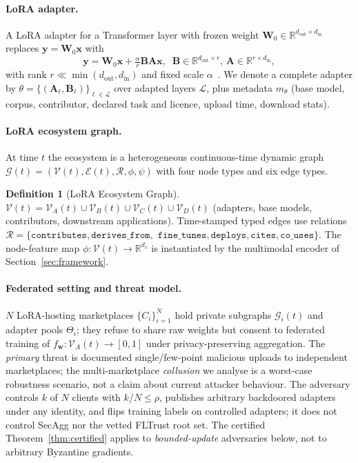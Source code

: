 \documentclass[11pt]{article}
\theoremstyle{plain}
\theoremstyle{definition}
\newtheorem{definition}{Definition}
\theoremstyle{remark}
\newcommand{\R}{\mathbb{R}}
\newcommand{\Gcal}{\mathcal{G}}
\newcommand{\Vcal}{\mathcal{V}}
\newcommand{\Ecal}{\mathcal{E}}
\newcommand{\Rcal}{\mathcal{R}}
\begin{document}
\paragraph{LoRA adapter.}
A LoRA adapter for a Transformer layer with frozen weight
$\mathbf{W}_0 \in \R^{d_{\mathrm{out}} \times d_{\mathrm{in}}}$
replaces $\mathbf{y} = \mathbf{W}_0 \mathbf{x}$ with
\begin{equation}
\mathbf{y} = \mathbf{W}_0 \mathbf{x} + \tfrac{\alpha}{r} \mathbf{B}\mathbf{A}\mathbf{x},\;\; \mathbf{B}\in\R^{d_{\mathrm{out}}\times r},\,\mathbf{A}\in\R^{r\times d_{\mathrm{in}}},
\label{eq:lora}
\end{equation}
with rank $r \ll \min(d_{\mathrm{out}}, d_{\mathrm{in}})$ and
fixed scale $\alpha$~\cite{hu2021lora}. We denote a complete
adapter by $\theta = \{(\mathbf{A}_\ell, \mathbf{B}_\ell)
\}_{\ell \in \mathcal{L}}$ over adapted layers $\mathcal{L}$,
plus metadata $m_\theta$ (base model, corpus, contributor,
declared task and licence, upload time, download stats).

\paragraph{LoRA ecosystem graph.}
At time $t$ the ecosystem is a heterogeneous continuous-time
dynamic graph $\Gcal(t) = (\Vcal(t), \Ecal(t), \Rcal, \phi, \psi)$
with four node types and six edge types.

\begin{definition}[LoRA Ecosystem Graph]
\label{def:graph}
$\Vcal(t) = \Vcal_A(t) \cup \Vcal_B(t) \cup \Vcal_C(t) \cup
\Vcal_D(t)$ (adapters, base models, contributors, downstream
applications). Time-stamped typed edges use relations $\Rcal =
\{\texttt{contributes}, \texttt{derives\_from},$
$\texttt{fine\_tunes}, \texttt{deploys}, \texttt{cites},
\texttt{co\_uses}\}$. The node-feature map $\phi:\Vcal(t)\to\R^{d_v}$
is instantiated by the multimodal encoder of
Section~\ref{sec:framework}.
\end{definition}

\paragraph{Federated setting and threat model.}
$N$ LoRA-hosting marketplaces $\{C_i\}_{i=1}^N$ hold private
subgraphs $\Gcal_i(t)$ and adapter pools $\Theta_i$; they refuse
to share raw weights but consent to federated training of
$f_{\mathbf{w}}:\Vcal_A(t)\!\to\![0,1]$ under privacy-preserving
aggregation. The \emph{primary} threat is documented
single/few-point malicious uploads to independent marketplaces;
the multi-marketplace \emph{collusion} we analyse is a worst-case
robustness scenario, not a claim about current attacker behaviour.
The adversary controls $k$ of $N$ clients with $k/N\!\le\!\rho$,
publishes arbitrary backdoored adapters under any identity, and
flips training labels on controlled adapters; it does not control
SecAgg nor the vetted FLTrust root set. The certified
Theorem~\ref{thm:certified} applies to \emph{bounded-update}
adversaries below, not to arbitrary Byzantine gradients.
\end{document}
